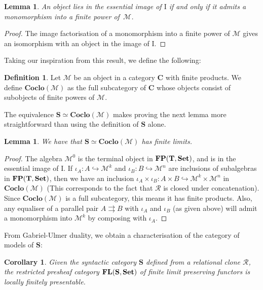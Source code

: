 \documentclass[11pt, a4paper, twoside,leqno]{amsart}
\newcommand{\cat}[1]{\mathbf{#1}}
\numberwithin{equation}{section}
\theoremstyle{plain}
\newtheorem{Cor}[Thm]{Corollary}
\newtheorem{Lemma}[Thm]{Lemma}
\theoremstyle{definition}
\newtheorem{Defn}[Thm]{Definition}
\newcommand{\Set}{\cat{Set}}
\DeclareMathOperator{\FP}{\bf FP}
\DeclareMathOperator{\FL}{\bf FL}
\begin{document}
\begin{Lemma}
  \label{lem:S-subcat-T-alg}
  An object lies in the essential
  image of \(\mathrm{I}
  \) if and only if it admits a monomorphism into a finite power
  of~\(\mathcal{M}\). 
\end{Lemma}

\begin{proof}
  The image factorisation of a monomorphism into a finite power of
  \(\mathcal{M}\) gives an isomorphism with an object in the image of \(\mathrm{I}
  \).
\end{proof}

Taking our inspiration from this result, we define the following:
\begin{Defn}
  \label{def:coclone-of-obj}
  Let \(\mathcal{M}\) be an object in a category \(\cat{C}\) with finite
  products. We define \(\cat{Coclo(\mathcal{M})}\) as the full
  subcategory of \(\cat{C}\) whose objects consist of subobjects of finite
  powers of \(\mathcal{M}\).
\end{Defn}

The equivalence \(\cat{S}\simeq \cat{Coclo}(\mathcal{M})\) makes
proving the next lemma more straightforward than using the definition
of \(\cat{S}\) alone.
\begin{Lemma}
  \label{lem:syntactic-cc-limits}
  We have that \(\cat{S}\simeq \cat{Coclo}(\mathcal{M})\) has finite limits.
\end{Lemma}

\begin{proof}
  The algebra
  \(\mathcal{M}^{0}\) is the terminal object in \(\FP(\cat{T},\Set)\),
  and is in the essential image of \(\mathrm{I}
  \). If
  \(\iota_{A} \colon A \hookrightarrow \mathcal{M}^{k}\) and \(\iota_{B} \colon B
  \hookrightarrow \mathcal{M}^{n}\) are inclusions of subalgebras in
  \(\FP(\cat{T},\Set)\), then we have an inclusion \(\iota_{A}\times \iota_{B} \colon
  A\times B \hookrightarrow \mathcal{M}^{k}\times \mathcal{M}^{n}\) in \(\cat{Coclo}(\mathcal{M})\)
  (This corresponds to the fact that \(\mathscr{R}\) is closed under
  concatenation). Since \(\cat{Coclo}(\mathcal{M})\) is a full
  subcategory, this means it has finite products.
  Also, any equaliser of a parallel pair \(A\rightrightarrows B\) with
  \(\iota_{A}\) and \(\iota_{B}\) (as given above) will admit a monomorphism into
  \(\mathcal{M}^{k}\) by composing with \(\iota_{A}\).
\end{proof}

From Gabriel-Ulmer duality, we obtain a characterisation of the
category of models of \(\cat{S}\):
\begin{Cor}
  \label{cor:coclone-models-lfp}
  Given the syntactic category \(\cat{S}\) defined from a relational
  clone \(\mathscr{R}\), the restricted presheaf category \(\FL(\cat{S},\Set)\) of finite
  limit preserving functors is locally finitely presentable.
\end{Cor}
\end{document}
